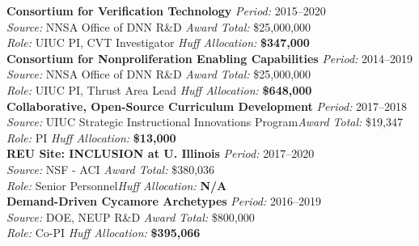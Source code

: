 \documentclass[margin,line]{resume}
\begin{document}
\begin{resume}
    \textbf{Consortium for Verification Technology} \hfill \textsl{Period:} 2015--2020\\
    \textsl{Source:} NNSA Office of DNN R\&D \hfill \textsl{Award Total:} \$25,000,000\\
    \textsl{Role:} UIUC PI, CVT Investigator  \hfill \textsl{Huff Allocation:} \textbf{\$347,000}\vspace{2mm}\\%
    \textbf{Consortium for Nonproliferation Enabling Capabilities} \hfill \textsl{Period:} 2014--2019\\
    \textsl{Source:} NNSA Office of DNN R\&D \hfill \textsl{Award Total:} \$25,000,000\\
    \textsl{Role:} UIUC PI, Thrust Area Lead  \hfill \textsl{Huff Allocation:} \textbf{\$648,000}\vspace{2mm}\\%
    \textbf{Collaborative, Open-Source Curriculum Development} \hfill \textsl{Period:} 2017--2018\\
    \textsl{Source:} UIUC Strategic Instructional Innovations Program\hfill \textsl{Award Total:} \$19,347\\
    \textsl{Role:} PI \hfill \textsl{Huff Allocation:} \textbf{\$13,000}\vspace{2mm}\\%
    \textbf{REU Site: INCLUSION at U. Illinois} \hfill \textsl{Period:}
    2017--2020\\
    \textsl{Source:} NSF - ACI \hfill \textsl{Award Total:} \$380,036\\
    \textsl{Role:} Senior Personnel\hfill \textsl{Huff Allocation:} \textbf{N/A}\vspace{2mm}\\%
    \textbf{Demand-Driven Cycamore Archetypes} \hfill \textsl{Period:} 2016--2019\\
    \textsl{Source:} DOE, NEUP R\&D \hfill \textsl{Award Total:} \$800,000\\
    \textsl{Role:} Co-PI \hfill \textsl{Huff Allocation:} \textbf{\$395,066}\vspace{2mm}\\%

\end{resume}
\end{document}
